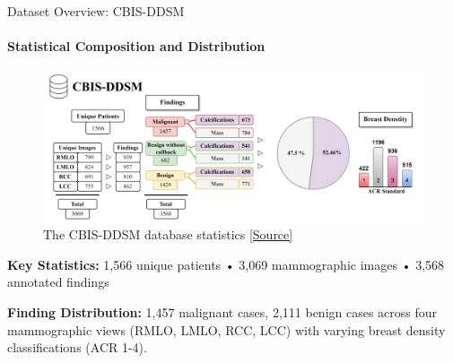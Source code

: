 \documentclass[8pt,aspectratio=169,xcolor=dvipsnames]{beamer}
\begin{document}
\begin{frame}{Dataset Overview: CBIS-DDSM}
    \framesubtitle{Statistical Composition and Distribution}
    
        \begin{figure}
        \centering
        \includegraphics[width=0.75\linewidth]{ddsm.png}
        \caption{The CBIS-DDSM database statistics \href{https://doi.org/10.3390/jimaging9050095}{[Source]}}
        \label{fig:enter-label}
    \end{figure}
    
    \vspace{0.2cm}
    
   
        \small
    \textbf{Key Statistics:} 1,566 unique patients • 3,069 mammographic images • 3,568 annotated findings
    
    \vspace{0.1cm}
    
    \textbf{Finding Distribution:} 1,457 malignant cases, 2,111 benign cases across four mammographic views (RMLO, LMLO, RCC, LCC) with varying breast density classifications (ACR 1-4).
    
    
\end{frame}
\end{document}
